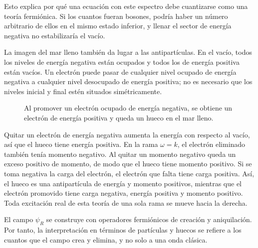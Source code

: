 Esto explica por qué una ecuación con este espectro debe cuantizarse como una teoría fermiónica. Si los cuantos fueran bosones, podría haber un número arbitrario de ellos en el mismo estado inferior, y llenar el sector de energía negativa no estabilizaría el vacío.

La imagen del mar lleno también da lugar a las antipartículas. En el vacío, todos los niveles de energía negativa están ocupados y todos los de energía positiva están vacíos. Un electrón puede pasar de cualquier nivel ocupado de energía negativa a cualquier nivel desocupado de energía positiva; no es necesario que los niveles inicial y final estén situados simétricamente.

\begin{figure}[htbp]
\centering
{}
\caption{Al promover un electrón ocupado de energía negativa, se obtiene un electrón de energía positiva y queda un hueco en el mar lleno.}
\end{figure}

Quitar un electrón de energía negativa aumenta la energía con respecto al vacío, así que el hueco tiene energía positiva. En la rama \(\omega=k\), el electrón eliminado también tenía momento negativo. Al quitar un momento negativo queda un exceso positivo de momento, de modo que el hueco tiene momento positivo. Si se toma negativa la carga del electrón, el electrón que falta tiene carga positiva. Así, el hueco es una antipartícula de energía y momento positivos, mientras que el electrón promovido tiene carga negativa, energía positiva y momento positivo. Toda excitación real de esta teoría de una sola rama se mueve hacia la derecha.

El campo \(\psi_R\) se construye con operadores fermiónicos de creación y aniquilación. Por tanto, la interpretación en términos de partículas y huecos se refiere a los cuantos que el campo crea y elimina, y no solo a una onda clásica.

